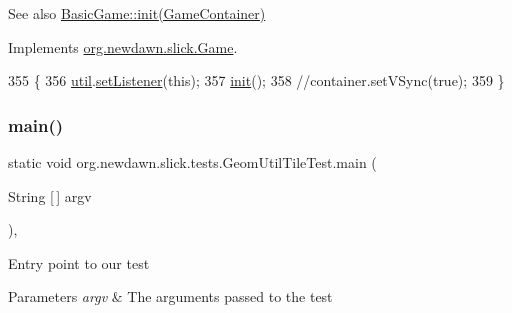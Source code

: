 \begin{DoxySeeAlso}{See also}
\mbox{\hyperlink{classorg_1_1newdawn_1_1slick_1_1_basic_game_a8af0900217e4d389249f71367b22d114}{Basic\+Game\+::init(\+Game\+Container)}} 
\end{DoxySeeAlso}


Implements \mbox{\hyperlink{interfaceorg_1_1newdawn_1_1slick_1_1_game_ad2dd6affab08bb8fdb5fab0815957b7a}{org.\+newdawn.\+slick.\+Game}}.


\begin{DoxyCode}
355                                                                     \{
356         \mbox{\hyperlink{classorg_1_1newdawn_1_1slick_1_1tests_1_1_geom_util_tile_test_aa29787931045895dd282b7b821145e02}{util}}.\mbox{\hyperlink{classorg_1_1newdawn_1_1slick_1_1geom_1_1_geom_util_a63310f3321f95f80909ae475187097f9}{setListener}}(\textcolor{keyword}{this});
357         \mbox{\hyperlink{classorg_1_1newdawn_1_1slick_1_1tests_1_1_geom_util_tile_test_adcd610185aaa46c043a85572ee6fb8fa}{init}}();
358         \textcolor{comment}{//container.setVSync(true);}
359     \}
\end{DoxyCode}
\mbox{\label{classorg_1_1newdawn_1_1slick_1_1tests_1_1_geom_util_tile_test_a0aa7ad66a594846606ede3e169e0d840}} 
\subsubsection{\texorpdfstring{main()}{main()}}
{\footnotesize\ttfamily static void org.\+newdawn.\+slick.\+tests.\+Geom\+Util\+Tile\+Test.\+main (\begin{DoxyParamCaption}\item[{String \mbox{[}$\,$\mbox{]}}]{argv }\end{DoxyParamCaption})\hspace{0.3cm}{\ttfamily [inline]}, {\ttfamily [static]}}

Entry point to our test


\begin{DoxyParams}{Parameters}
{\em argv} & The arguments passed to the test \\
\hline
\end{DoxyParams}

